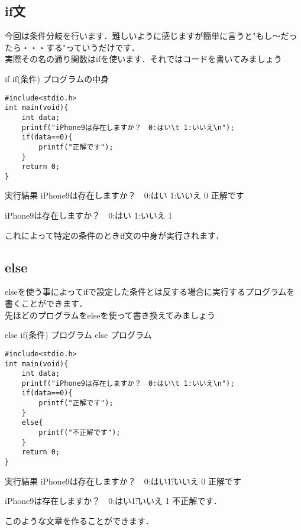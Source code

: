 \documentclass[a4j,titlepage,dvipdfmx]{jsarticle}   %
\begin{document}
\subsection{if文}
今回は条件分岐を行います．難しいように感じますが簡単に言うと"もし〜だったら・・・する"っていうだけです．\\
実際その名の通り関数はifを使います．それではコードを書いてみましょう
\begin{itembox}{if}
if(条件){
	プログラムの中身
}
\end{itembox}
\begin{lstlisting}
#include<stdio.h>
int main(void){
	int data;
    printf("iPhone9は存在しますか？　0:はい\t 1:いいえ\n");
    if(data==0){
    	printf("正解です");
    }
    return 0;
}
\end{lstlisting}
\begin{itembox}{実行結果}
iPhone9は存在しますか？　0:はい      1:いいえ
0
正解です

iPhone9は存在しますか？　0:はい      1:いいえ
1
\end{itembox}
これによって特定の条件のときif文の中身が実行されます．
\subsection{else}
elseを使う事によってifで設定した条件とは反する場合に実行するプログラムを書くことができます．\\
先ほどのプログラムをelseを使って書き換えてみましょう
\begin{itembox}{else}
if(条件) {
	プログラム
}
else{
	プログラム
}
\end{itembox}
\begin{lstlisting}
#include<stdio.h>
int main(void){
	int data;
    printf("iPhone9は存在しますか？　0:はい\t 1:いいえ\n");
    if(data==0){
    	printf("正解です");
    }
    else{
    	printf("不正解です");
    }
    return 0;
}
\end{lstlisting}
\begin{itembox}{実行結果}
iPhone9は存在しますか？　0:はい\t 1:いいえ
0
正解です

iPhone9は存在しますか？　0:はい\t 1:いいえ
1
不正解です．
\end{itembox}
このような文章を作ることができます．\\
\end{document}
